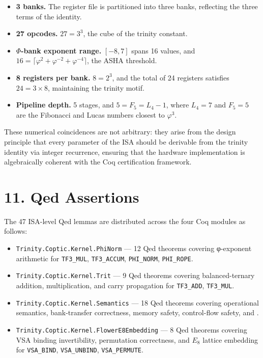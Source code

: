 \begin{itemize}
\tightlist
\item
  \textbf{3 banks.} The register file is partitioned into three
  banks, reflecting the three terms of the identity.
\item
  \textbf{27 opcodes.} \(27 = 3^3\), the cube of the trinity
  constant.
\item
  \textbf{$\Phi$-bank exponent range.} $[-8, 7]$ spans 16 values,
  and \(16 = \lceil\varphi^2 + \varphi^{-2} + \varphi^{-4}\rceil\),
  the ASHA threshold.
\item
  \textbf{8 registers per bank.} \(8 = 2^3\), and the total of
  24 registers satisfies \(24 = 3 \times 8\), maintaining the
  trinity motif.
\item
  \textbf{Pipeline depth.} 5 stages, and
  \(5 = F_5 = L_4 - 1\), where \(L_4 = 7\) and \(F_5 = 5\)
  are the Fibonacci and Lucas numbers closest to \(\varphi^3\).
\end{itemize}

These numerical coincidences are not arbitrary: they arise from
the design principle that every parameter of the ISA should be
derivable from the trinity identity via integer recurrence, ensuring
that the hardware implementation is algebraically coherent with the
Coq certification framework.

\section{11. Qed Assertions}\label{fa_71:qed-assertions}

The 47 ISA-level Qed lemmas are distributed across the four Coq
modules as follows:

\begin{itemize}
\tightlist
\item
  \texttt{Trinity.Coptic.Kernel.PhiNorm} --- 12 Qed theorems
  covering φ-exponent arithmetic for \texttt{TF3\_MUL},
  \texttt{TF3\_ACCUM}, \texttt{PHI\_NORM}, \texttt{PHI\_ROPE}.
\item
  \texttt{Trinity.Coptic.Kernel.Trit} --- 9 Qed theorems
  covering balanced-ternary addition, multiplication, and carry
  propagation for \texttt{TF3\_ADD}, \texttt{TF3\_MUL}.
\item
  \texttt{Trinity.Coptic.Kernel.Semantics} --- 18 Qed theorems
  covering operational semantics, bank-transfer correctness,
  memory safety, control-flow safety, and
  .
\item
  \texttt{Trinity.Coptic.Kernel.FlowerE8Embedding} --- 8 Qed
  theorems covering VSA binding invertibility, permutation
  correctness, and $E_8$ lattice embedding for
  \texttt{VSA\_BIND}, \texttt{VSA\_UNBIND}, \texttt{VSA\_PERMUTE}.
\end{itemize}

